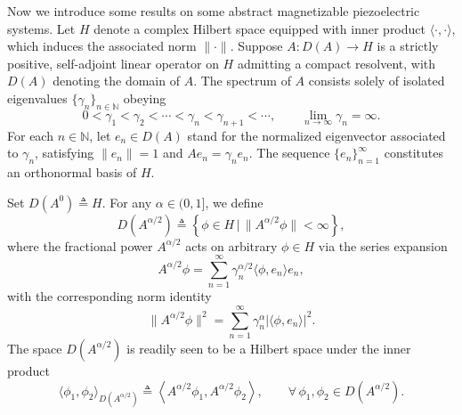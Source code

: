 \documentclass[12pt,reqno]{article}
\begin{document}
Now we introduce some results on some abstract magnetizable piezoelectric systems. Let $H$ denote a complex Hilbert space equipped with inner product $\langle\cdot,\cdot\rangle$, which induces the associated norm $\|\cdot\|$. Suppose $A:D(A)\to H$ is a strictly positive, self-adjoint linear operator on $H$ admitting a compact resolvent, with $D(A)$ denoting the domain of $A$. The spectrum of $A$ consists solely of isolated eigenvalues $\{\gamma_n\}_{n\in\mathbb{N}}$ obeying
\[
0 < \gamma_1 < \gamma_2 < \cdots < \gamma_n < \gamma_{n+1} < \cdots,\qquad \lim_{n\to\infty}\gamma_n = \infty.
\]
For each $n\in\mathbb{N}$, let $e_n\in D(A)$ stand for the normalized eigenvector associated to $\gamma_n$, satisfying $\|e_n\|=1$ and $A e_n = \gamma_n e_n$. The sequence $\{e_n\}_{n=1}^\infty$ constitutes an orthonormal basis of $H$.

Set $D(A^0)\triangleq H$. For any $\alpha\in(0,1]$, we define
\begin{equation}\label{DAalpha}
D(A^{\alpha/2})\triangleq\left\{\phi\in H\,\bigg|\,\|A^{\alpha/2}\phi\|<\infty\right\},
\end{equation}
where the fractional power $A^{\alpha/2}$ acts on arbitrary $\phi\in H$ via the series expansion
\[
A^{\alpha/2}\phi=\sum_{n=1}^\infty\gamma_n^{\alpha/2}\langle\phi,e_n\rangle e_n,
\]
with the corresponding norm identity
\[
\|A^{\alpha/2}\phi\|^2=\sum_{n=1}^\infty\gamma_n^\alpha\bigl|\langle\phi,e_n\rangle\bigr|^2.
\]
The space $D(A^{\alpha/2})$ is readily seen to be a Hilbert space under the inner product
\begin{equation}\label{innerDAalpha}
\langle\phi_1,\phi_2\rangle_{D(A^{\alpha/2})}\triangleq\left\langle A^{\alpha/2}\phi_1,A^{\alpha/2}\phi_2\right\rangle,\qquad
\forall\,\phi_1,\phi_2\in D(A^{\alpha/2}).
\end{equation}
\end{document}
